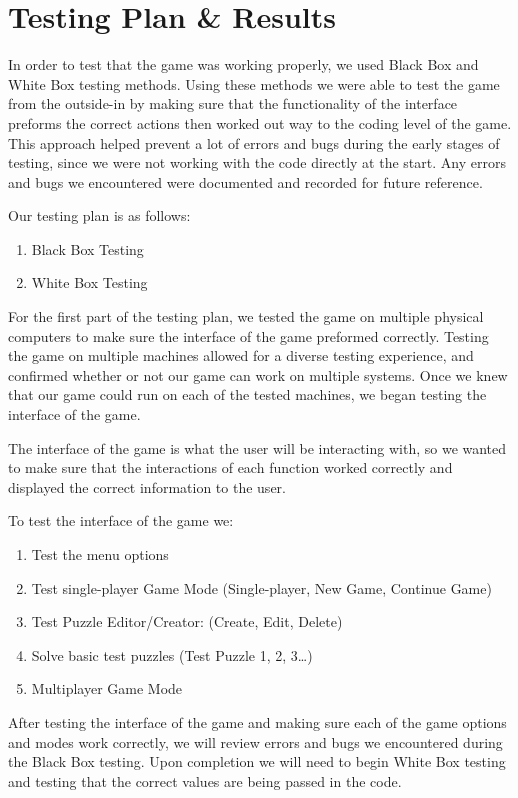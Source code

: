 \documentclass[12pt]{article}
\begin{document}
\section{Testing Plan \& Results}

In order to test that the game was working properly, we used Black Box and White Box testing methods. Using these methods we were able to test the game from the outside-in by making sure that the functionality of the interface preforms the correct actions then worked out way to the coding level of the game. This approach helped prevent a lot of errors and bugs during the early stages of testing, since we were not working with the code directly at the start. Any errors and bugs we encountered  were documented and recorded for future reference.

Our testing plan is as follows:
\begin{enumerate}
\item Black Box Testing
\item White Box Testing
\end{enumerate}

For the first part of the testing plan, we tested the game on multiple physical computers to make sure the interface of the game preformed correctly. Testing the game on multiple machines allowed for a diverse testing experience, and confirmed whether or not our game can work on multiple systems. Once we knew that our game could run on each of the tested machines, we began testing the interface of the game.

The interface of the game is what the user will be interacting with, so we wanted to make sure that the interactions of each function worked correctly and displayed the correct information to the user.

 To test the interface of the game we:
 
\begin{enumerate}
\item Test the menu options
\item Test single-player Game Mode (Single-player, New Game, Continue Game)
\item Test Puzzle Editor/Creator: (Create, Edit, Delete)
\item Solve basic test puzzles (Test Puzzle 1, 2, 3\dots)
\item Multiplayer Game Mode
\end{enumerate}

After testing the interface of the game and making sure each of the game options and modes work correctly, we will review errors and bugs we encountered during the Black Box testing. Upon completion we will need to begin White Box testing and testing that the correct values are being passed in the code.
\end{document}
